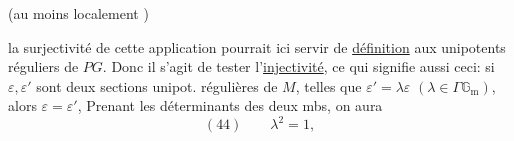 (au moins localement   )

la surjectivité de cette application pourrait ici servir de \uline{définition} aux unipotents réguliers de $PG$. Donc il s'agit de tester l'\uline{injectivité}, ce qui signifie aussi  ceci: si $\varepsilon,\varepsilon'$ sont deux sections unipot. régulières de $M$, telles que  $\varepsilon'=\lambda\varepsilon$ $(\lambda\in\Gamma\mathbb G_{\mathrm m})$, alors $\varepsilon=\varepsilon'$,  Prenant les déterminants des deux mbs, on aura
\[
(44)\qquad\lambda^2=1,
\]


